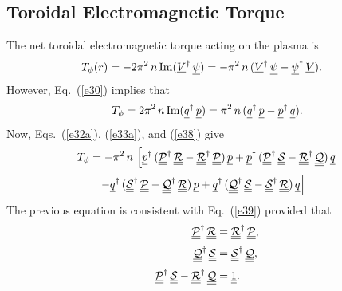 \documentclass[12pt,prb,aps,notitlepage]{revtex4-1}
\begin{document}
\subsection{Toroidal Electromagnetic Torque}
The net toroidal electromagnetic torque acting on the plasma is
\begin{align}\label{e38}
T_\phi(r) &= -2\pi^2\,n\,{\rm Im}(\underline{V}^\dag\,\underline{\psi})= -\pi^2\,n\,(\underline{V}^\dag\,\underline{\psi}-\underline{\psi}^\dag\,\underline{V}).
\end{align}
However, Eq.~(\ref{e30}) implies that
\begin{equation}\label{e39}
T_\phi= 2\pi^2\,n\,{\rm Im}(\underline{q}^\dag\,\underline{p})= \pi^2\,n\,(\underline{q}^\dag\,\underline{p}- \underline{p}^\dag\,\underline{q}).
\end{equation}
Now, Eqs.~(\ref{e32a}), (\ref{e33a}), and (\ref{e38}) give 
\begin{align}
T_\phi&= -\pi^2\,n\,\left[
\underline{p}^\dag\,(\underline{\underline{\cal P}}^\dag\,\underline{\underline{\cal R}}
- \underline{\underline{\cal R}}^\dag\,\underline{\underline{\cal P}})\,\underline{p}
+\underline{p}^\dag\,(\underline{\underline{\cal P}}^\dag\,\underline{\underline{\cal S}}
-\underline{\underline{\cal R}}^\dag\,\underline{\underline{\cal Q}})\,\underline{q}\right.\nonumber\\[0.5ex]
&\phantom{=}\left.- \underline{q}^\dag\,(\underline{\underline{\cal S}}^\dag\,\underline{\underline{\cal P}}
- \underline{\underline{\cal Q}}^\dag\,\underline{\underline{\cal R}})\,\underline{p}
+\underline{q}^\dag\,(\underline{\underline{\cal Q}}^\dag\,\underline{\underline{\cal S}}
- \underline{\underline{\cal S}}^\dag\,\underline{\underline{\cal R}})\,\underline{q}
\right]
\end{align}
The previous equation is consistent with Eq.~(\ref{e39}) provided that
\begin{align}\label{e41}
\underline{\underline{\cal P}}^\dag\,\underline{\underline{\cal R}}&= \underline{\underline{\cal R}}^\dag\,\underline{\underline{\cal P}},\\[0.5ex]
\underline{\underline{\cal Q}}^\dag\,\underline{\underline{\cal S}}&= \underline{\underline{\cal S}}^\dag\,\underline{\underline{\cal Q}},\label{e42}\\[0.5ex]
\underline{\underline{\cal P}}^\dag\,\underline{\underline{\cal S}}- \underline{\underline{\cal R}}^\dag\,\underline{\underline{\cal Q}}&=\underline{\underline{1}}.\label{e43}
\end{align}
\end{document}
